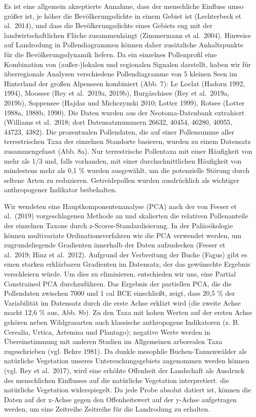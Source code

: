 \documentclass[
]{article}
\begin{document}
Es ist eine allgemein akzeptierte Annahme, dass der menschliche Einfluss umso größer ist, je höher die Bevölkerungsdichte in einem Gebiet ist (Lechterbeck et al.~2014), und dass die Bevölkerungsdichte eines Gebiets eng mit der landwirtschaftlichen Fläche zusammenhängt (Zimmermann et al.~2004). Hinweise auf Landrodung in Pollendiagrammen können daher zusätzliche Anhaltspunkte für die Bevölkerungsdynamik liefern. Da ein einzelnes Pollenprofil eine Kombination von (außer-)lokalen und regionalen Signalen darstellt, haben wir für überregionale Analysen verschiedene Pollendiagramme von 5 kleinen Seen im Hinterland der großen Alpenseen kombiniert (Abb. 7): Le Loclat (Hadorn 1992, 1994), Moossee (Rey et al.~2019a, 2019b), Burgäschisee (Rey et al.~2019a, 2019b), Soppensee (Hajdas und Michczynski 2010; Lotter 1999), Rotsee (Lotter 1988a, 1988b, 1990). Die Daten wurden aus der Neotoma-Datenbank extrahiert (Williams et al.~2018; dort Datensatznummern 26632, 40454, 46280, 40955, 44723, 4382). Die prozentualen Pollendaten, die auf einer Pollensumme aller terrestrischen Taxa der einzelnen Standorte basieren, wurden zu einem Datensatz zusammengefasst (Abb. 8a). Nur terrestrische Pollentaxa mit einer Häufigkeit von mehr als 1/3 und, falls vorhanden, mit einer durchschnittlichen Häufigkeit von mindestens mehr als 0,1 \% wurden ausgewählt, um die potenzielle Störung durch seltene Arten zu reduzieren. Getreidepollen wurden ausdrücklich als wichtiger anthropogener Indikator beibehalten.

Wir wendeten eine Hauptkomponentenanalyse (PCA) nach der von Feeser et al.~(2019) vorgeschlagenen Methode an und skalierten die relativen Pollenanteile der einzelnen Taxone durch z-Scores-Standardisierung. In der Paläoökologie können multivariate Ordinationsverfahren wie die PCA verwendet werden, um zugrundeliegende Gradienten innerhalb der Daten aufzudecken (Feeser et al.~2019; Hinz et al.~2012). Aufgrund der Verbreitung der Buche (Fagus) gibt es einen starken erklärbaren Gradienten im Datensatz, der das gewünschte Ergebnis verschleiern würde. Um dies zu eliminieren, entschieden wir uns, eine Partial Constrained PCA durchzuführen. Das Ergebnis der partiellen PCA, die die Pollendaten zwischen 7000 und 1 cal BCE einschließt, zeigt, dass 20,5 \% der Variabilität im Datensatz durch die erste Achse erklärt wird (die zweite Achse macht 12,6 \% aus, Abb. 8b). Zu den Taxa mit hohen Werten auf der ersten Achse gehören neben Wildgrasarten auch klassische anthropogene Indikatoren (z. B. Cerealia, Urtica, Artemisa und Plantago); negative Werte werden in Übereinstimmung mit anderen Studien im Allgemeinen arborealen Taxa zugeschrieben (vgl. Behre 1981). Da dunkle mesophile Buchen-Tannenwälder als natürliche Vegetation unseres Untersuchungsgebiets angenommen werden können (vgl. Rey et al.~2017), wird eine erhöhte Offenheit der Landschaft als Ausdruck des menschlichen Einflusses auf die natürliche Vegetation interpretiert. die natürliche Vegetation widerspiegelt. Da jede Probe absolut datiert ist, können die Daten auf der x-Achse gegen den Offenheitswert auf der y-Achse aufgetragen werden, um eine Zeitreihe Zeitreihe für die Landrodung zu erhalten.
\end{document}
